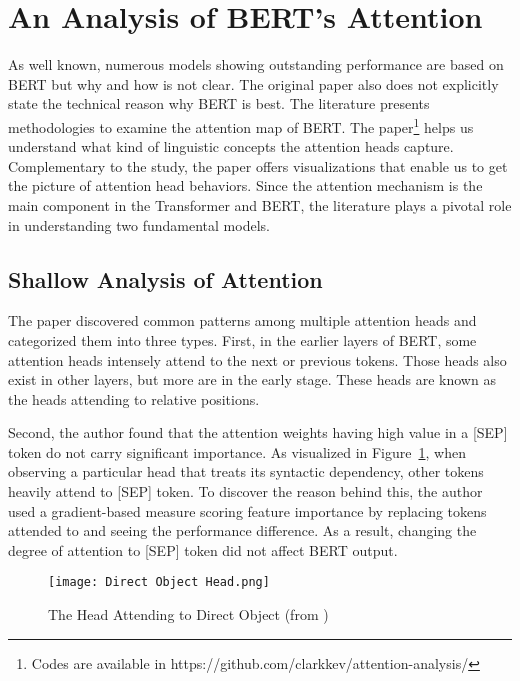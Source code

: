 \documentclass[letterpaper, 11pt]{article}
\begin{document}
\section{An Analysis of BERT’s Attention}
\label{sec:bert-attention}
As well known, numerous models showing outstanding performance are based on BERT but why and how is not clear. The original paper \citep{devlin-etal-2019-bert} also does not explicitly state the technical reason why BERT is best. The literature \citep{clark-etal-2019-bert} presents methodologies to examine the attention map of BERT. The paper\footnote{Codes are available in https://github.com/clarkkev/attention-analysis/} helps us understand what kind of linguistic concepts the attention heads capture. Complementary to the study, the paper offers visualizations that enable us to get the picture of attention head behaviors. Since the attention mechanism is the main component in the Transformer and BERT, the literature plays a pivotal role in understanding two fundamental models.

\subsection{Shallow Analysis of Attention}
\label{sec:attention-analysis}
The paper discovered common patterns among multiple attention heads and categorized them into three types. First, in the earlier layers of BERT, some attention heads intensely attend to the next or previous tokens. Those heads also exist in other layers, but more are in the early stage. These heads are known as the heads attending to relative positions.

Second, the author found that the attention weights having high value in a [SEP] token do not carry significant importance. As visualized in Figure~\ref{fig:direct-object-head}, when observing a particular head that treats its syntactic dependency, other tokens heavily attend to [SEP] token. To discover the reason behind this, the author used a gradient-based measure scoring feature importance by replacing tokens attended to and seeing the performance difference. As a result, changing the degree of attention to [SEP] token did not affect BERT output.

\begin{figure}
    \centering
    \texttt{[image: Direct Object Head.png]}
    \caption{The Head Attending to Direct Object (from \citet{clark-etal-2019-bert})}
    \label{fig:direct-object-head}
\end{figure}
\end{document}
